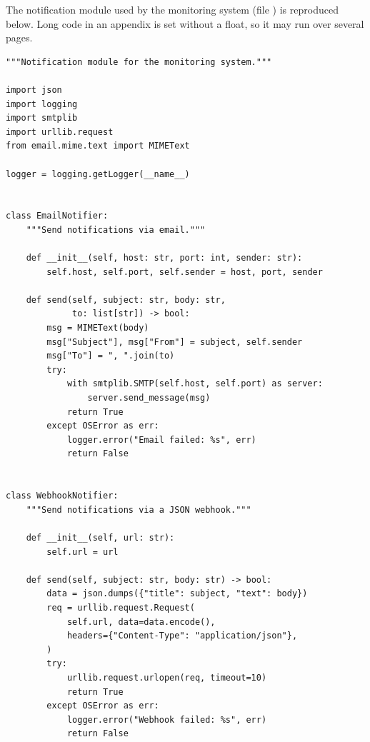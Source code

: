 \label{app:code}

The notification module used by the monitoring system (file ) is reproduced below.
Long code in an appendix is set without a float, so it may run over several pages.

\begin{verbatim}
"""Notification module for the monitoring system."""

import json
import logging
import smtplib
import urllib.request
from email.mime.text import MIMEText

logger = logging.getLogger(__name__)


class EmailNotifier:
    """Send notifications via email."""

    def __init__(self, host: str, port: int, sender: str):
        self.host, self.port, self.sender = host, port, sender

    def send(self, subject: str, body: str,
             to: list[str]) -> bool:
        msg = MIMEText(body)
        msg["Subject"], msg["From"] = subject, self.sender
        msg["To"] = ", ".join(to)
        try:
            with smtplib.SMTP(self.host, self.port) as server:
                server.send_message(msg)
            return True
        except OSError as err:
            logger.error("Email failed: %s", err)
            return False


class WebhookNotifier:
    """Send notifications via a JSON webhook."""

    def __init__(self, url: str):
        self.url = url

    def send(self, subject: str, body: str) -> bool:
        data = json.dumps({"title": subject, "text": body})
        req = urllib.request.Request(
            self.url, data=data.encode(),
            headers={"Content-Type": "application/json"},
        )
        try:
            urllib.request.urlopen(req, timeout=10)
            return True
        except OSError as err:
            logger.error("Webhook failed: %s", err)
            return False
\end{verbatim}
